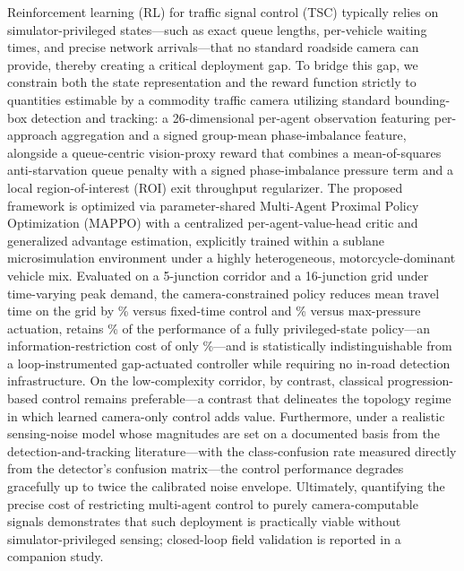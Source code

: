 Reinforcement learning (RL) for traffic signal control (TSC) typically relies on simulator-privileged states—such as exact queue lengths, per-vehicle waiting times, and precise network arrivals—that no standard roadside camera can provide, thereby creating a critical deployment gap. To bridge this gap, we constrain both the state representation and the reward function strictly to quantities estimable by a commodity traffic camera utilizing standard bounding-box detection and tracking: a 26-dimensional per-agent observation featuring per-approach aggregation and a signed group-mean phase-imbalance feature, alongside a queue-centric vision-proxy reward that combines a mean-of-squares anti-starvation queue penalty with a signed phase-imbalance pressure term and a local region-of-interest (ROI) exit throughput regularizer. The proposed framework is optimized via parameter-shared Multi-Agent Proximal Policy Optimization (MAPPO) with a centralized per-agent-value-head critic and generalized advantage estimation, explicitly trained within a sublane microsimulation environment under a highly heterogeneous, motorcycle-dominant vehicle mix. Evaluated on a 5-junction corridor and a 16-junction grid under time-varying peak demand, the camera-constrained policy reduces mean travel time on the grid by \ImproveFixed\% versus fixed-time control and \ImproveMaxP\% versus max-pressure actuation, retains \RetainPriv\% of the performance of a fully privileged-state policy---an information-restriction cost of only \RestrictionCost\%---and is statistically indistinguishable from a loop-instrumented gap-actuated controller while requiring no in-road detection infrastructure. On the low-complexity corridor, by contrast, classical progression-based control remains preferable---a contrast that delineates the topology regime in which learned camera-only control adds value. Furthermore, under a realistic sensing-noise model whose magnitudes are set on a documented basis from the detection-and-tracking literature---with the class-confusion rate measured directly from the detector's confusion matrix---the control performance degrades gracefully up to twice the calibrated noise envelope. Ultimately, quantifying the precise cost of restricting multi-agent control to purely camera-computable signals demonstrates that such deployment is practically viable without simulator-privileged sensing; closed-loop field validation is reported in a companion study.